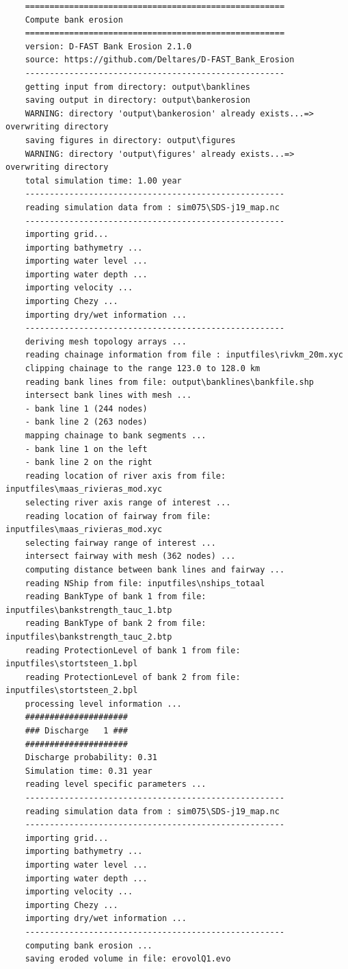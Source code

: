 \begin{Verbatim}
	=====================================================
	Compute bank erosion
	=====================================================
	version: D-FAST Bank Erosion 2.1.0
	source: https://github.com/Deltares/D-FAST_Bank_Erosion
	-----------------------------------------------------
	getting input from directory: output\banklines
	saving output in directory: output\bankerosion
	WARNING: directory 'output\bankerosion' already exists...=> overwriting directory
	saving figures in directory: output\figures
	WARNING: directory 'output\figures' already exists...=> overwriting directory
	total simulation time: 1.00 year
	-----------------------------------------------------
	reading simulation data from : sim075\SDS-j19_map.nc
	-----------------------------------------------------
	importing grid...
	importing bathymetry ...
	importing water level ...
	importing water depth ...
	importing velocity ...
	importing Chezy ...
	importing dry/wet information ...
	-----------------------------------------------------
	deriving mesh topology arrays ...
	reading chainage information from file : inputfiles\rivkm_20m.xyc
	clipping chainage to the range 123.0 to 128.0 km
	reading bank lines from file: output\banklines\bankfile.shp
	intersect bank lines with mesh ...
	- bank line 1 (244 nodes)
	- bank line 2 (263 nodes)
	mapping chainage to bank segments ...
	- bank line 1 on the left
	- bank line 2 on the right
	reading location of river axis from file: inputfiles\maas_rivieras_mod.xyc
	selecting river axis range of interest ...
	reading location of fairway from file: inputfiles\maas_rivieras_mod.xyc
	selecting fairway range of interest ...
	intersect fairway with mesh (362 nodes) ...
	computing distance between bank lines and fairway ...
	reading NShip from file: inputfiles\nships_totaal
	reading BankType of bank 1 from file: inputfiles\bankstrength_tauc_1.btp
	reading BankType of bank 2 from file: inputfiles\bankstrength_tauc_2.btp
	reading ProtectionLevel of bank 1 from file: inputfiles\stortsteen_1.bpl
	reading ProtectionLevel of bank 2 from file: inputfiles\stortsteen_2.bpl
	processing level information ...
	#####################
	### Discharge   1 ###
	#####################
	Discharge probability: 0.31
	Simulation time: 0.31 year
	reading level specific parameters ...
	-----------------------------------------------------
	reading simulation data from : sim075\SDS-j19_map.nc
	-----------------------------------------------------
	importing grid...
	importing bathymetry ...
	importing water level ...
	importing water depth ...
	importing velocity ...
	importing Chezy ...
	importing dry/wet information ...
	-----------------------------------------------------
	computing bank erosion ...
	saving eroded volume in file: erovolQ1.evo
	

\end{Verbatim}
